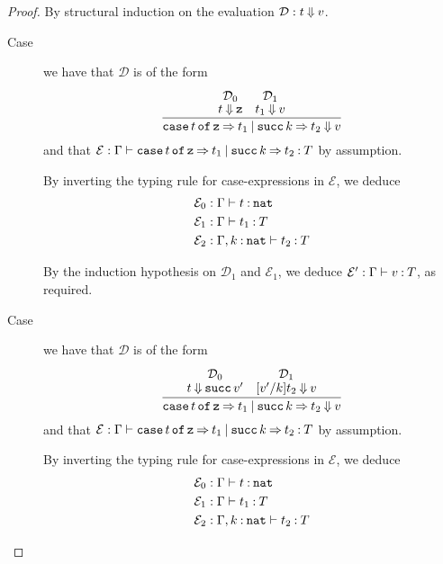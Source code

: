 \documentclass[11pt,letterpaper]{article}
\renewcommand{\succ}{\operatorname{\mathtt{succ}}}
\newcommand{\nat}{\mathtt{nat}}
\newcommand{\case}[1]{\operatorname{\mathtt{case}}#1\operatorname{\mathtt{of}}}
\begin{document}
\begin{enumerate}
    \begin{proof}
      By structural induction on the evaluation $\mathcal{D} : t \mathbin{\Downarrow} v$.
      \begin{description}
        \item[Case] we have that $\mathcal{D}$ is of the form
          \begin{equation*}
            \infer{%
              \case{t} \mathtt{z} \goesto t_1
              \orcase \succ k \goesto t_2%
              \evalbig
              v
            }{%
              \deduce[\mathcal{D}_0]{t \evalbig \mathtt{z}}{}
              &
              \deduce[\mathcal{D}_1]{t_1 \evalbig v}{}%
            }
          \end{equation*}
          and that
          $\mathcal{E} :
          \Gamma \proves
          \case{t} \mathtt{z} \goesto t_1
          \orcase \succ k \goesto t_2
          \hastype T$
          by assumption.

          By inverting the typing rule for case-expressions in $\mathcal{E}$,
          we deduce
          \begin{align*}
            \mathcal{E}_0 &: \Gamma \proves t \hastype \nat \\
            \mathcal{E}_1 &: \Gamma \proves t_1 \hastype T \\
            \mathcal{E}_2 &: \Gamma, k\hastype \nat \proves t_2 \hastype T
          \end{align*}

          By the induction hypothesis on $\mathcal{D}_1$ and $\mathcal{E}_1$,
          we deduce
          $\mathcal{E}^\prime : \Gamma \vdash v \mathbin{:} T$, as required.

        \item[Case] we have that $\mathcal{D}$ is of the form
          \begin{equation*}
            \infer{%
              \case{t} \mathtt{z} \goesto t_1
              \orcase \succ k \goesto t_2%
              \evalbig
              v
            }{%
              \deduce[\mathcal{D}_0]{t \evalbig \succ v^\prime}{}
              &
              \deduce[\mathcal{D}_1]{[v^\prime/k]t_2 \evalbig v}{}%
            }
          \end{equation*}
          and that
          $\mathcal{E} :
          \Gamma \proves
          \case{t} \mathtt{z} \goesto t_1
          \orcase \succ k \goesto t_2
          \hastype T$
          by assumption.

          By inverting the typing rule for case-expressions in $\mathcal{E}$,
          we deduce
          \begin{align*}
            \mathcal{E}_0 &: \Gamma \proves t \hastype \nat \\
            \mathcal{E}_1 &: \Gamma \proves t_1 \hastype T \\
            \mathcal{E}_2 &: \Gamma, k\hastype \nat \proves t_2 \hastype T
          \end{align*}


\end{description}
\end{proof}
\end{enumerate}
\end{document}
